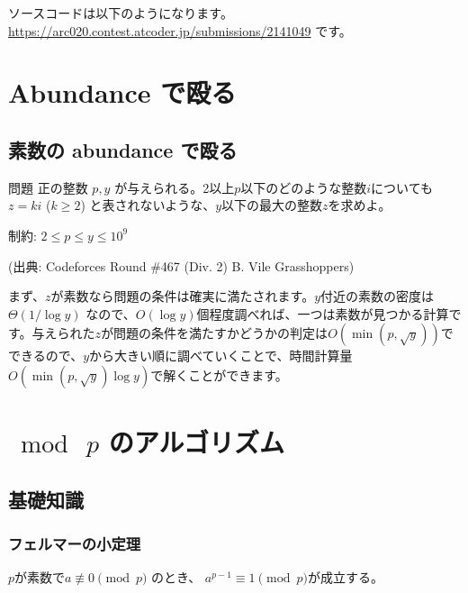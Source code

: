 \documentclass{jsarticle}
\begin{document}
  ソースコードは以下のようになります。\url{https://arc020.contest.atcoder.jp/submissions/2141049} です。
  
 \section{Abundance で殴る}
  \subsection{素数の abundance で殴る}
  \label{subsec:abundance-of-prime-numbers}
  \begin{itembox}[l]{問題}
   正の整数 $p,y$ が与えられる。2以上$p$以下のどのような整数$i$についても$z = ki$ ($k \ge 2$) と表されないような、$y$以下の最大の整数$z$を求めよ。

   制約: $2 \le p \le y \le 10^9$

   (出典: Codeforces Round \#467 (Div. 2) B. Vile Grasshoppers)
  \end{itembox}
  まず、$z$が素数なら問題の条件は確実に満たされます。$y$付近の素数の密度は$\Theta(1/\log y)$ なので、$O(\log y)$個程度調べれば、一つは素数が見つかる計算です。与えられた$z$が問題の条件を満たすかどうかの判定は$O(\min(p, \sqrt{y}))$でできるので、$y$から大きい順に調べていくことで、時間計算量$O(\min(p, \sqrt{y})\log y)$で解くことができます。
 \section{$\bmod\ p$ のアルゴリズム}
  \subsection{基礎知識}
  \label{subsec:group-preliminaries}
   \subsubsection{フェルマーの小定理}
   \begin{theorem}
    \label{thm:fermats-little-theorem}
    $p$が素数で$a \not \equiv 0 \pmod p$ のとき、 $a^{p-1} \equiv 1 \pmod p$が成立する。
   \end{theorem}
\end{document}
